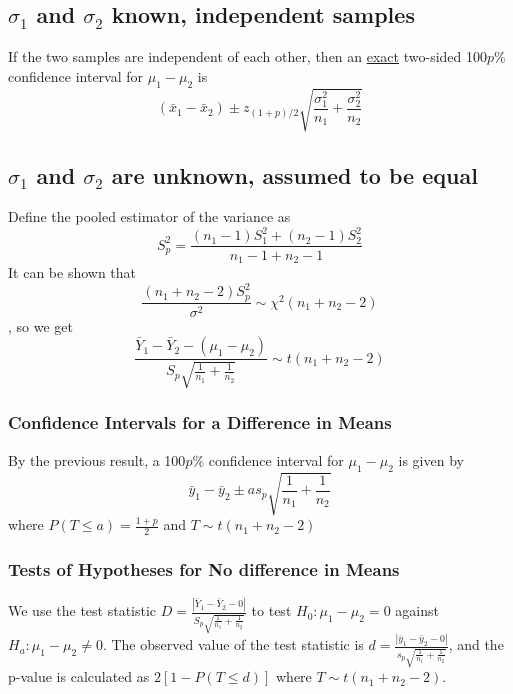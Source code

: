\documentclass[12pt]{article}
\begin{document}
\subsection{$\sigma_1$ and $\sigma_2$ known, independent samples}
If the two samples are independent of each other, then an \underline{exact} two-sided 100$p\%$ confidence interval for $\mu_1-\mu_2$ is \[(\bar x_1-\bar x_2)\pm z_{(1+p)/2}\sqrt{\frac{\sigma^2_1}{n_1}+\frac{\sigma^2_2}{n_2}}\]
\subsection{$\sigma_1$ and $\sigma_2$ are unknown, assumed to be equal}
Define the pooled estimator of the variance as \[S_p^2=\frac{(n_1-1)S^2_1+(n_2-1)S_2^2}{n_1-1+n_2-1}\]
It can be shown that \[\frac{(n_1+n_2-2)S_p^2}{\sigma^2}\sim \chi^2(n_1+n_2-2)\], so we get \[\frac{\bar Y_1-\bar Y_2-(\mu_1-\mu_2)}{S_p\sqrt{\frac{1}{n_1}+\frac{1}{n_2}}}\sim t(n_1+n_2-2)\]
\subsubsection{Confidence Intervals for a Difference in Means}
By the previous result, a 100$p\%$ confidence interval for $\mu_1-\mu_2$ is given by \[\bar y_1-\bar y_2\pm as_p\sqrt{\frac{1}{n_1}+\frac{1}{n_2}}\] where $P(T\leq a)=\frac{1+p}{2}$ and $T\sim t(n_1+n_2-2)$
\subsubsection{Tests of Hypotheses for No difference in Means}
We use the test statistic $D=\frac{|\bar Y_1-\bar Y_2-0|}{S_p\sqrt{\frac{1}{n_1}+\frac{1}{n_2}}}$ to test $H_0:\mu_1-\mu_2=0$ against $H_a:\mu_1-\mu_2\neq 0$. The observed value of the test statistic is $d=\frac{|\bar y_1-\bar y_2-0|}{s_p\sqrt{\frac{1}{n_1}+\frac{1}{n_2}}}$, and the p-value is calculated as $2[1-P(T\leq d)]$ where $T\sim t(n_1+n_2-2)$.
\end{document}
